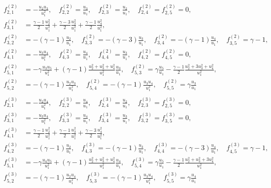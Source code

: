 \documentclass{turgon}
\begin{document}
\begin{align}
  \begin{aligned}
    f^{(2)}_{2,1} &= -\frac{u_2u_3}{u_1^2}, \quad
    f^{(2)}_{2,2} = \frac{u_3}{u_1}, \quad
    f^{(2)}_{2,3} = \frac{u_2}{u_1}, \quad
    f^{(2)}_{2,4} = f^{(2)}_{2,5} = 0, \\
    f^{(2)}_{3,1} &= \frac{\gamma-1}{2}\frac{u_2^2}{u_1^2}
    + \frac{\gamma-3}{2}\frac{u_3^2}{u_1^2}
    + \frac{\gamma-1}{2}\frac{u_4^2}{u_1^2}, \\
    f^{(2)}_{3,2} &= -(\gamma-1)\frac{u_2}{u_1}, \quad
    f^{(2)}_{3,3} = -(\gamma-3)\frac{u_3}{u_1}, \quad
    f^{(2)}_{3,4} = -(\gamma-1)\frac{u_4}{u_1}, \quad
    f^{(2)}_{3,5} = \gamma-1, \\
    f^{(2)}_{4,1} &= -\frac{u_3u_4}{u_1^2}, \quad
    f^{(2)}_{4,3} = \frac{u_4}{u_1}, \quad
    f^{(2)}_{4,4} = \frac{u_3}{u_1}, \quad
    f^{(2)}_{4,2} = f^{(2)}_{4,5} = 0, \\
    f^{(2)}_{5,1} &= -\gamma\frac{u_3u_5}{u_1^2}
    + (\gamma-1)\frac{u_2^2+u_3^2+u_4^2}{u_1^2}\frac{u_3}{u_1}, \quad
    f^{(2)}_{5,3} = \gamma\frac{u_5}{u_1}
    - \frac{\gamma-1}{2}\frac{u_2^2 + 3u_3^2 + u_4^2}{u_1^2}, \\
    f^{(2)}_{5,2} &= -(\gamma-1)\frac{u_2u_3}{u_1^2}, \quad
    f^{(2)}_{5,4} = -(\gamma-1)\frac{u_3u_4}{u_1^2}, \quad
    f^{(2)}_{5,5} = \gamma\frac{u_3}{u_1}
  \end{aligned}
  \label{e:euler:jaco2}
\end{align}
%
\begin{align}
  \begin{aligned}
    f^{(3)}_{2,1} &= -\frac{u_2u_4}{u_1^2}, \quad
    f^{(3)}_{2,2} = \frac{u_4}{u_1}, \quad
    f^{(3)}_{2,4} = \frac{u_2}{u_1}, \quad
    f^{(3)}_{2,3} = f^{(3)}_{2,5} = 0, \\
    f^{(3)}_{3,1} &= -\frac{u_3u_4}{u_1^2}, \quad
    f^{(3)}_{3,3} = \frac{u_4}{u_1}, \quad
    f^{(3)}_{3,4} = \frac{u_3}{u_1}, \quad
    f^{(3)}_{3,2} = f^{(3)}_{3,5} = 0, \\
    f^{(3)}_{4,1} &= \frac{\gamma-1}{2}\frac{u_2^2}{u_1^2}
    + \frac{\gamma-1}{2}\frac{u_3^2}{u_1^2}
    + \frac{\gamma-3}{2}\frac{u_4^2}{u_1^2}, \\
    f^{(3)}_{4,2} &= -(\gamma-1)\frac{u_2}{u_1}, \quad
    f^{(3)}_{4,3} = -(\gamma-1)\frac{u_3}{u_1}, \quad
    f^{(3)}_{4,4} = -(\gamma-3)\frac{u_4}{u_1}, \quad
    f^{(3)}_{4,5} = \gamma-1, \\
    f^{(3)}_{5,1} &= -\gamma\frac{u_4u_5}{u_1^2}
    + (\gamma-1)\frac{u_2^2+u_3^2+u_4^2}{u_1^2}\frac{u_4}{u_1}, \quad
    f^{(3)}_{5,4} = \gamma\frac{u_5}{u_1}
    - \frac{\gamma-1}{2}\frac{u_2^2 + u_3^2 + 3u_4^2}{u_1^2}, \\
    f^{(3)}_{5,2} &= -(\gamma-1)\frac{u_2u_4}{u_1^2}, \quad
    f^{(3)}_{5,3} = -(\gamma-1)\frac{u_3u_4}{u_1^2}, \quad
    f^{(3)}_{5,5} = \gamma\frac{u_4}{u_1}
  \end{aligned}
  \label{e:euler:jaco3}
\end{align}
\end{document}

